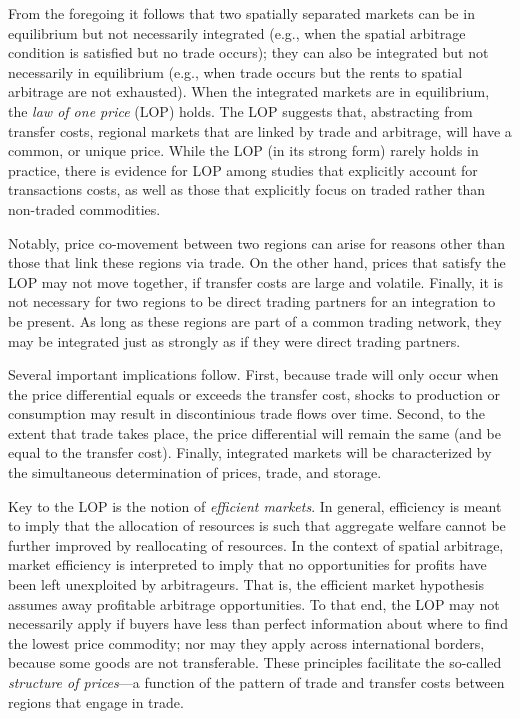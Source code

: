 \documentclass[
]{book}
\begin{document}
From the foregoing it follows that two spatially separated markets can be in equilibrium but not necessarily integrated (e.g., when the spatial arbitrage condition is satisfied but no trade occurs); they can also be integrated but not necessarily in equilibrium (e.g., when trade occurs but the rents to spatial arbitrage are not exhausted). When the integrated markets are in equilibrium, the \emph{law of one price} (LOP) holds. The LOP suggests that, abstracting from transfer costs, regional markets that are linked by trade and arbitrage, will have a common, or unique price. While the LOP (in its strong form) rarely holds in practice, there is evidence for LOP among studies that explicitly account for transactions costs, as well as those that explicitly focus on traded rather than non-traded commodities.

Notably, price co-movement between two regions can arise for reasons other than those that link these regions via trade. On the other hand, prices that satisfy the LOP may not move together, if transfer costs are large and volatile. Finally, it is not necessary for two regions to be direct trading partners for an integration to be present. As long as these regions are part of a common trading network, they may be integrated just as strongly as if they were direct trading partners.

Several important implications follow. First, because trade will only occur when the price differential equals or exceeds the transfer cost, shocks to production or consumption may result in discontinious trade flows over time. Second, to the extent that trade takes place, the price differential will remain the same (and be equal to the transfer cost). Finally, integrated markets will be characterized by the simultaneous determination of prices, trade, and storage.

Key to the LOP is the notion of \emph{efficient markets}. In general, efficiency is meant to imply that the allocation of resources is such that aggregate welfare cannot be further improved by reallocating of resources. In the context of spatial arbitrage, market efficiency is interpreted to imply that no opportunities for profits have been left unexploited by arbitrageurs. That is, the efficient market hypothesis assumes away profitable arbitrage opportunities. To that end, the LOP may not necessarily apply if buyers have less than perfect information about where to find the lowest price commodity; nor may they apply across international borders, because some goods are not transferable. These principles facilitate the so-called \emph{structure of prices}---a function of the pattern of trade and transfer costs between regions that engage in trade.
\end{document}
